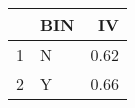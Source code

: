 \begin{table}[ht]
\centering
\begin{tabular}{rlr}
  \hline
 & BIN & IV \\ 
  \hline
1 & N & 0.62 \\ 
  2 & Y & 0.66 \\ 
   \hline
\end{tabular}
\end{table}
